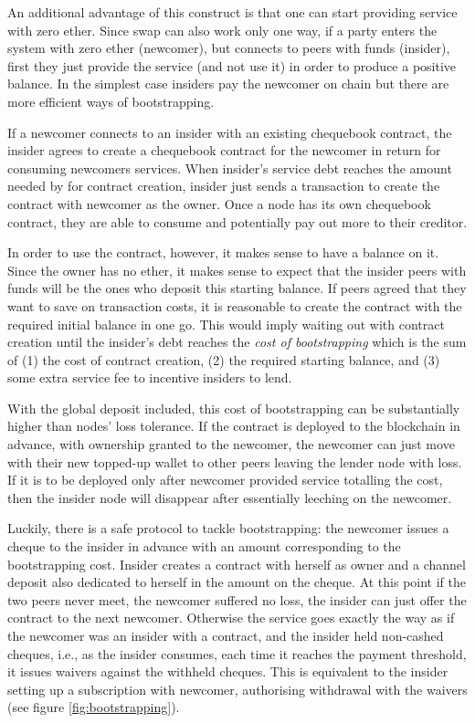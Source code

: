 An additional advantage of this construct is that one can start providing service with zero ether.
Since swap can also work only one way, if a party enters the system with zero ether (newcomer),
but connects to peers with funds (insider), first they just provide the service (and not use it)
in order to produce a positive balance. In the simplest case insiders pay the newcomer on chain
but there are more efficient ways of bootstrapping.

If a newcomer connects to  an insider with an existing chequebook contract,
the insider agrees to create a chequebook contract for the newcomer
in return for consuming newcomers services.
 When insider's service debt reaches the amount needed by for contract creation,
 insider just sends a transaction to create the contract with newcomer as the owner.
Once a node has its own chequebook contract, they are able
to consume and potentially pay out more to their creditor.

In order to use the contract, however, it makes sense to have a balance on it.
Since the owner has no ether, it makes sense
to expect that the insider peers with funds will be the ones who deposit this starting balance.
If peers agreed that they want to save on transaction costs, it is reasonable to create
the contract with the required initial balance in one go. This would imply waiting out
with contract creation until the insider's debt reaches the \emph{cost of bootstrapping} which is
the sum of (1) the cost of contract creation, (2) the required starting balance, and (3) some
extra service fee to incentive insiders to lend.

With the global deposit included, this cost of bootstrapping
can be substantially higher than nodes' loss tolerance.
If the contract is deployed to the blockchain in advance, with ownership granted
to the newcomer, the newcomer can just move with their new topped-up wallet
to other peers leaving the lender node with loss.
If it is to be deployed only after newcomer provided service totalling
the cost, then the insider node will disappear after essentially leeching on
the newcomer.

Luckily, there is a safe protocol to tackle
bootstrapping: the newcomer issues a cheque to the insider in advance with an amount
corresponding to the bootstrapping cost. Insider creates a contract with herself as owner
and a channel deposit also dedicated to herself in the amount
on the cheque. At this point if the two peers never meet, the newcomer suffered no loss,
the insider can just offer the contract to the next newcomer. Otherwise the service goes
exactly the way as if the newcomer was an insider with a contract, and the insider held
non-cashed cheques, i.e., as the insider consumes, each time it reaches the
payment threshold, it issues waivers against the withheld cheques. This is equivalent
to the insider setting up a subscription with newcomer, authorising withdrawal
with the waivers (see figure \ref{fig:bootstrapping}).

